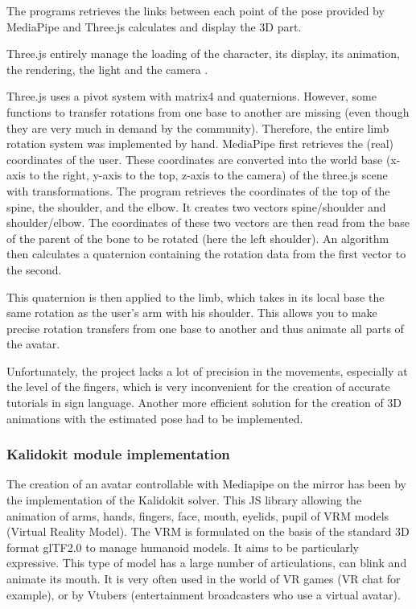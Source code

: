 The programs retrieves the links between each point of the pose provided by MediaPipe and Three.js calculates and display the 3D part. 

Three.js entirely manage the loading of the character, its display, its animation, the rendering, the light and the camera .

Three.js uses a pivot system with matrix4 and quaternions. However, some functions to transfer rotations from one base to
another are missing (even though they are very much in demand by the community). Therefore, the entire limb rotation system was implemented by hand.
MediaPipe first retrieves the (real) coordinates of the user. These coordinates are converted into the world base (x-axis to the right, y-axis to the top, z-axis to the camera) of the three.js scene with transformations. The program retrieves the coordinates of the top of the spine, the shoulder, and the elbow. It creates two vectors spine/shoulder and shoulder/elbow. The coordinates of these two vectors are then read from the base of the parent of the bone to be rotated (here the left shoulder). An algorithm then calculates a quaternion containing the rotation data from the first vector to the second.

This quaternion is then applied to the limb, which takes in its local base the same rotation as the user’s arm with his shoulder.
This allows you to make precise rotation transfers from one base to another and thus animate all parts of the avatar.

Unfortunately, the project lacks a lot of precision in the movements, especially at the level of the fingers, which is very inconvenient for the creation of accurate tutorials in sign language. Another more efficient solution for the creation of 3D animations with the estimated pose had to be implemented.

\subsubsection{Kalidokit module implementation}

The creation of an avatar controllable with Mediapipe on the mirror has been by the implementation of the Kalidokit solver. This JS library allowing the animation of arms, hands, fingers, face, mouth, eyelids, pupil of VRM models (Virtual Reality Model). The VRM is formulated on the basis of the standard 3D format glTF2.0 to manage humanoid models. It aims to be particularly expressive. This type of model has a large number of articulations, can blink and animate its mouth. It is very often used in the world of VR games (VR chat for example), or by Vtubers (entertainment broadcasters who use a virtual avatar).  

